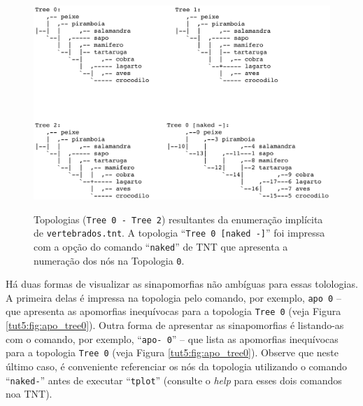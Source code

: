 \begin{refsection}
  \begin{figure}[H]
       \centering
      {\includegraphics[scale=0.80]{figures/tut5/vertebrate_trees.eps}}
	{\caption[Enumeração implícita de \texttt{vertebrados.tnt}]{Topologias (\texttt{Tree 0 - Tree 2}) resultantes da enumeração implícita de \texttt{vertebrados.tnt}. A topologia ``\texttt{Tree 0 [naked -]}'' foi impressa com a opção do comando ``\texttt{naked}'' de TNT que apresenta a numeração dos nós na Topologia \texttt{0}.}\label{tut5:fig:apo_vert}}
  \end{figure}


Há duas formas de visualizar as sinapomorfias não ambíguas para essas tolologias. A primeira delas é impressa na topologia pelo comando, por exemplo, \texttt{apo 0} -- que apresenta as apomorfias inequívocas para a topologia \texttt{Tree 0} (veja Figura \ref{tut5:fig:apo_tree0}). Outra forma de apresentar as sinapomorfias é listando-as com o comando, por exemplo, ``\texttt{apo- 0}'' -- que lista as apomorfias inequívocas para a topologia \texttt{Tree 0} (veja Figura \ref{tut5:fig:apo_tree0}). Observe que neste último caso, é conveniente referenciar os nós da topologia utilizando o comando ``\texttt{naked-}'' antes de executar ``\texttt{tplot}'' (consulte o \textit{help} para esses dois comandos noa TNT).



\end{refsection}
